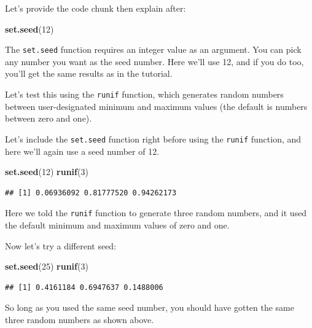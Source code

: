 \documentclass[
]{book}
\newenvironment{Shaded}{\begin{snugshade}}{\end{snugshade}}
\newcommand{\DecValTok}[1]{\textcolor[rgb]{0.00,0.00,0.81}{#1}}
\newcommand{\FunctionTok}[1]{\textcolor[rgb]{0.13,0.29,0.53}{\textbf{#1}}}
\newcommand{\NormalTok}[1]{#1}
\begin{document}
Let's provide the code chunk then explain after:

\begin{Shaded}
\begin{Highlighting}[]
\FunctionTok{set.seed}\NormalTok{(}\DecValTok{12}\NormalTok{)}
\end{Highlighting}
\end{Shaded}

The \texttt{set.seed} function requires an integer value as an argument. You can pick any number you want as the seed number. Here we'll use 12, and if you do too, you'll get the same results as in the tutorial.

Let's test this using the \texttt{runif} function, which generates random numbers between user-designated minimum and maximum values (the default is numbers between zero and one).

Let's include the \texttt{set.seed} function right before using the \texttt{runif} function, and here we'll again use a seed number of 12.

\begin{Shaded}
\begin{Highlighting}[]
\FunctionTok{set.seed}\NormalTok{(}\DecValTok{12}\NormalTok{)}
\FunctionTok{runif}\NormalTok{(}\DecValTok{3}\NormalTok{)}
\end{Highlighting}
\end{Shaded}

\begin{verbatim}
## [1] 0.06936092 0.81777520 0.94262173
\end{verbatim}

Here we told the \texttt{runif} function to generate three random numbers, and it used the default minimum and maximum values of zero and one.

Now let's try a different seed:

\begin{Shaded}
\begin{Highlighting}[]
\FunctionTok{set.seed}\NormalTok{(}\DecValTok{25}\NormalTok{)}
\FunctionTok{runif}\NormalTok{(}\DecValTok{3}\NormalTok{)}
\end{Highlighting}
\end{Shaded}

\begin{verbatim}
## [1] 0.4161184 0.6947637 0.1488006
\end{verbatim}

So long as you used the same seed number, you should have gotten the same three random numbers as shown above.
\end{document}
